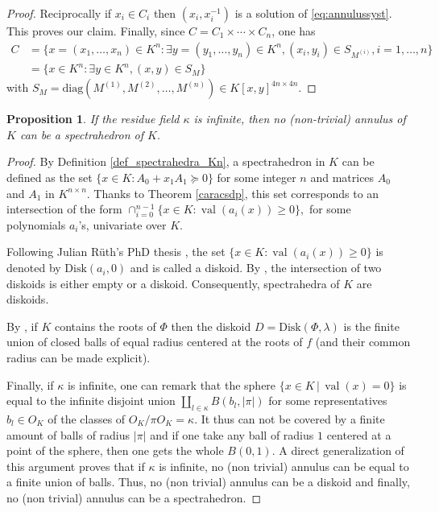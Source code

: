 \documentclass[a4paper,12pt]{article}
\newtheorem{proposition}[theorem]{Proposition}
\DeclareMathOperator{\val}{val}
\def\diag{\mathrm{diag}}
\begin{document}
\begin{proof}
Reciprocally if $x_i \in C_i$ then $(x_i,x_i^{-1})$ is a solution of \eqref{eq:annulussyst}.
This proves our claim.
Finally, since $C = C_1 \times \cdots \times C_n$, one has
\begin{equation*}
  \begin{aligned}
    C &=
    \{x=(x_1,\ldots,x_n) \in K^n : \exists y = (y_1,\ldots,y_n) \in K^n, (x_i,y_i) \in S_{M^{(i)}}, i=1,\ldots,n\} \\
    &= \{x \in K^n : \exists y \in K^n, (x,y) \in S_M\}
  \end{aligned}
\end{equation*}
with $S_M = \diag\left(M^{(1)}, M^{(2)}, \ldots, M^{(n)}\right) \in K[x,y]^{4n \times 4n}.$
\end{proof}


\begin{proposition}
If the residue field $\kappa$ is infinite, then
no (non-trivial) annulus of $K$ can be a spectrahedron of $K.$
\end{proposition}
\begin{proof}
By Definition \ref{def_spectrahedra_Kn}, a spectrahedron in $K$ 
can be defined as the set $\{x \in K : A_0+x_1A_1 \succeq 0\}$
for some integer $n$ and matrices $A_0$ and $A_1$ in $K^{n \times n}$.
Thanks to Theorem \ref{caracsdp},
this set corresponds to an intersection of the form
$\cap_{i=0}^{n-1} \{ x \in K : \val(a_i(x)) \geq 0 \},$
for some polynomials $a_i$'s, univariate over $K$.

Following Julian Rüth's PhD thesis \cite{ruth_models_2015},
the set $\{ x \in K : \val(a_i(x)) \geq 0 \}$
is denoted by $\textrm{Disk}(a_i,0)$ and is called 
a diskoid.
By \cite[Lemma 4.44]{ruth_models_2015}, the intersection
of two diskoids is either empty or a diskoid.
Consequently, spectrahedra of $K$ are diskoids.

By \cite[Lemma 4.43]{ruth_models_2015}, if $K$
contains the roots of $\Phi$ then the diskoid
$D=\textrm{Disk}(\Phi, \lambda)$ is the finite union
of closed balls of equal radius centered at the roots of $f$ (and their common radius can be made explicit).

Finally, if $\kappa$ is infinite, one can remark that the sphere
$\{x \in K \,|\,  \val(x) =0\}$ is equal to the infinite disjoint union $\amalg_{l \in \kappa} B(b_l, \vert \pi \vert)$ for some 
representatives $b_l \in O_K$ of the classes of $O_K / \pi O_K=\kappa.$
It thus can not be covered by a finite amount of balls of radius $\vert \pi \vert$
and if one take any ball of radius $1$ centered at a point of the sphere, then one gets the whole
$B(0,1).$
A direct generalization of this argument proves that
if $\kappa$ is infinite, no (non trivial) annulus can be equal to
a finite union of balls. Thus, no (non trivial) annulus can be a diskoid and finally, no (non trivial) annulus can be a spectrahedron.
\end{proof}
\end{document}
